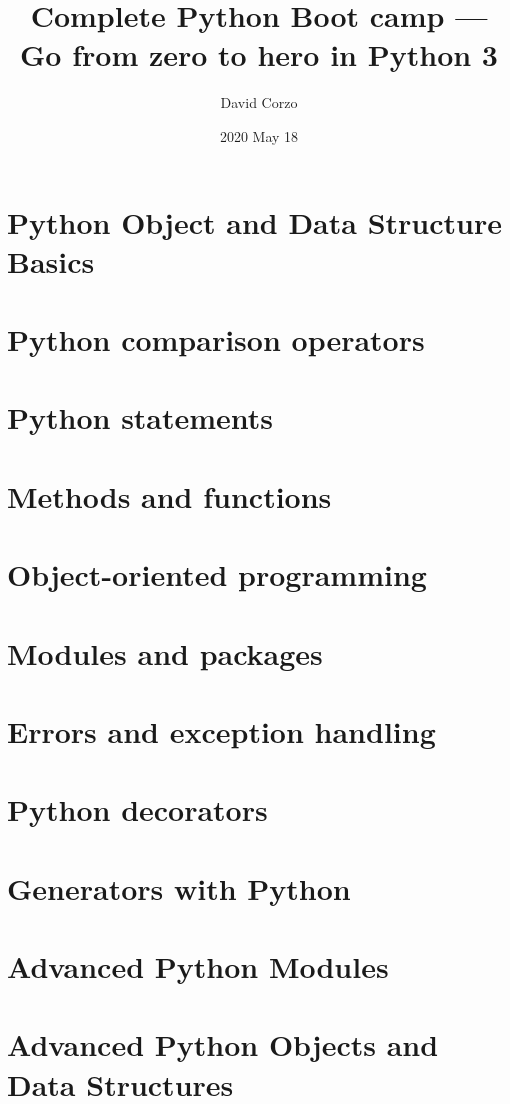 \documentclass[openany,12pt]{book}
\title{Complete Python Boot camp — Go from zero to hero in Python 3 }
\date{2020 May 18} %
\author{David Corzo}
\begin{document}
\maketitle
\tableofcontents
\chapter{Python Object and Data Structure Basics}


\chapter{Python comparison operators}


\chapter{Python statements}


\chapter{Methods and functions}


\chapter{Object-oriented programming}


\chapter{Modules and packages}


\chapter{Errors and exception handling}


\chapter{Python decorators}


\chapter{Generators with Python}


\chapter{Advanced Python Modules}


\chapter{Advanced Python Objects and Data Structures}


\end{document}
